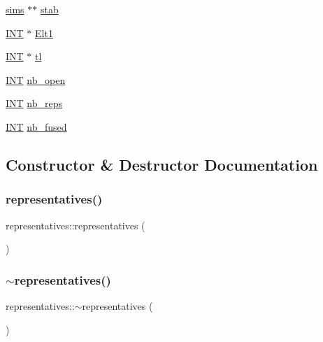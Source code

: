 \begin{DoxyCompactItemize}
\item 
\mbox{\hyperlink{classsims}{sims}} $\ast$$\ast$ \mbox{\hyperlink{classrepresentatives_a1a4987be45c045b41b9cbfb7c8a3f067}{stab}}
\item 
\mbox{\hyperlink{galois_8h_a09fddde158a3a20bd2dcadb609de11dc}{I\+NT}} $\ast$ \mbox{\hyperlink{classrepresentatives_a86b9f3b48cb8474599520d12e3f067f5}{Elt1}}
\item 
\mbox{\hyperlink{galois_8h_a09fddde158a3a20bd2dcadb609de11dc}{I\+NT}} $\ast$ \mbox{\hyperlink{classrepresentatives_a2e5a34807e1b69ead55daabafa2554e1}{tl}}
\item 
\mbox{\hyperlink{galois_8h_a09fddde158a3a20bd2dcadb609de11dc}{I\+NT}} \mbox{\hyperlink{classrepresentatives_a498c031555a8a96041a749fdf30a8907}{nb\+\_\+open}}
\item 
\mbox{\hyperlink{galois_8h_a09fddde158a3a20bd2dcadb609de11dc}{I\+NT}} \mbox{\hyperlink{classrepresentatives_a2ca52bc883cf56b08cbeb417fe55ba53}{nb\+\_\+reps}}
\item 
\mbox{\hyperlink{galois_8h_a09fddde158a3a20bd2dcadb609de11dc}{I\+NT}} \mbox{\hyperlink{classrepresentatives_afb4af68df7ac88138f9b652964af27bd}{nb\+\_\+fused}}
\end{DoxyCompactItemize}


\subsection{Constructor \& Destructor Documentation}
\mbox{\label{classrepresentatives_a1048087011f3c333bee9e6b263ee5032}} 
\subsubsection{\texorpdfstring{representatives()}{representatives()}}
{\footnotesize\ttfamily representatives\+::representatives (\begin{DoxyParamCaption}{ }\end{DoxyParamCaption})}

\mbox{\label{classrepresentatives_a982ee727309ddc7b76dd09a804ff4da3}} 
\subsubsection{\texorpdfstring{$\sim$representatives()}{~representatives()}}
{\footnotesize\ttfamily representatives\+::$\sim$representatives (\begin{DoxyParamCaption}{ }\end{DoxyParamCaption})}



